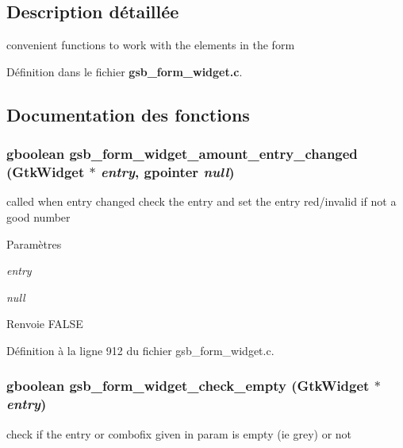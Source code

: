 \subsection{Description détaillée}
convenient functions to work with the elements in the form 

Définition dans le fichier {\bf gsb\_\-form\_\-widget.c}.



\subsection{Documentation des fonctions}
\subsubsection[{gsb\_\-form\_\-widget\_\-amount\_\-entry\_\-changed}]{\setlength{\rightskip}{0pt plus 5cm}gboolean gsb\_\-form\_\-widget\_\-amount\_\-entry\_\-changed (GtkWidget $\ast$ {\em entry}, \/  gpointer {\em null})}\label{gsb__form__widget_8c_a7398bf4ce9d9bebb04a02f7a771a58fa}
called when entry changed check the entry and set the entry red/invalid if not a good number


\begin{DoxyParams}{Paramètres}
\item[{\em entry}]\item[{\em null}]\end{DoxyParams}
\begin{DoxyReturn}{Renvoie}
FALSE 
\end{DoxyReturn}


Définition à la ligne 912 du fichier gsb\_\-form\_\-widget.c.

\subsubsection[{gsb\_\-form\_\-widget\_\-check\_\-empty}]{\setlength{\rightskip}{0pt plus 5cm}gboolean gsb\_\-form\_\-widget\_\-check\_\-empty (GtkWidget $\ast$ {\em entry})}\label{gsb__form__widget_8c_ab190653d3c006279c4b0bc9bfea4d8c4}
check if the entry or combofix given in param is empty (ie grey) or not


